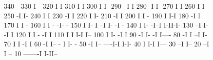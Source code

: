 \begin{figure}[p]
\begin{minipage}[t]{.495\textwidth}
\begin{XMPfrac}{3.3}
     340                                    -
     330                                    I -
     320                                    I I
     310                                    I I
     300                                    I-I-
     290                                  --I  I
     280                                 -I    I-
     270                                 I      I
     260                                 I      I
     250                                -I      I-
     240                                I        I
     230                               -I        I
     220                               I         I-
     210                              -I          I
     200                              I           I -
     190                              I           I-I
     180                             -I             I
     170                             I              I                                -
     160                             I              I                          -    -I-   -
     150                             I              I-                         I  --I I- -I -
     140                             I               I-                       -I--I    I-II-I-
     130                           --I                I-                     -I              I
     120                           I                   I                  - -I               I
     110                           I                   I                  I-I                I--
     100                           I                   I-                -I                    I
      90                          -I                    I-              -I                     I----
      80                         -I                      I            --I                          I-
      70                         I                       I           -I                             I
      60                        -I                       I--       - I                              I- -
      50                       -I                          I-- ----I-I                               I-I-
      40                       I                             I-I                                        I---
      30                     --I                                                                           I--
      20                   --I                                                                               I --
      10            -------I                                                                                 I-II--
 

\end{XMPfrac}
\end{minipage}
\end{figure}
